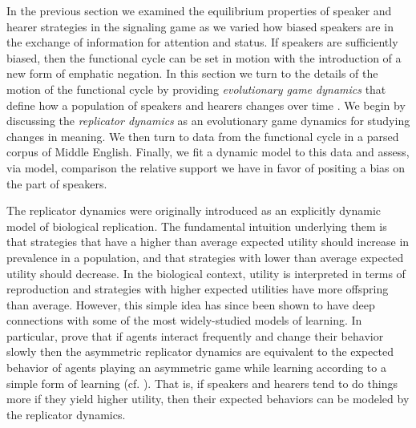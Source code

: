 \documentclass[linguex]{sp}
\theoremstyle{definition} \newtheorem{definition}{Definition}
\begin{document}
In the previous section we examined the equilibrium properties of speaker and hearer strategies in the signaling game as we varied how biased speakers are in the exchange of information for attention and status. If speakers are sufficiently biased, then the functional cycle can be set in motion with the introduction of a new form of emphatic negation. In this section we turn to the details of the motion of the functional cycle by providing \emph{evolutionary game dynamics} that define how a population of speakers and hearers changes over time \citep{hofbauer-sigmund1998}. We begin by discussing the \emph{replicator dynamics} \citep{taylor-jonker:1978} as an evolutionary game dynamics for studying changes in meaning. We then turn to data from the functional cycle in a parsed corpus of Middle English. Finally, we fit a dynamic model to this data and assess, via model, comparison the relative support we have in favor of positing a bias on  the part of speakers.

The replicator dynamics were originally introduced as an explicitly dynamic model of biological replication. The fundamental intuition underlying them is that strategies that have a higher than average expected utility should increase in prevalence in a population, and that strategies with lower than average expected utility should decrease. In the biological context, utility is interpreted in terms of reproduction and strategies with higher expected utilities have more offspring than average. However, this simple idea has since been shown to have deep connections with some of the most widely-studied models of learning. In particular, \cite{borgers-sarin1997} prove that if agents interact frequently and change their behavior slowly then the asymmetric replicator dynamics are equivalent to the expected behavior of agents playing an asymmetric game while learning according to a simple form of learning (cf. \citealt{bush-mosteller1955, sutton-barto1998}). That is, if speakers and hearers tend to do things more if they yield higher utility, then their expected behaviors can be modeled by the replicator dynamics. 
\end{document}
